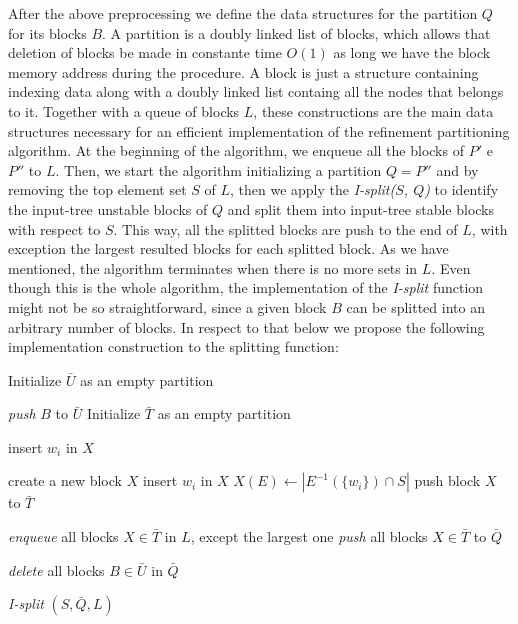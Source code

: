 \documentclass[12pt]{diazessay} %
\begin{document}
After the above preprocessing we define the data structures for the partition $Q$ for its blocks $B$. A partition is a doubly linked list of blocks, which allows that deletion of blocks be made in constante time $O(1)$ as long we have the block memory address during the procedure. A block is just a structure containing indexing data along with a doubly linked list containg all the nodes that belongs to it. Together with a queue of blocks $L$, these constructions are the main data structures necessary for an efficient implementation of the refinement partitioning algorithm. At the beginning of the algorithm, we enqueue all the blocks of $P'$ e $P''$ to $L$. Then, we start the algorithm initializing a partition $Q = P''$ and by removing the top element set $S$ of $L$, then we apply the \textit{I-split($S$, $Q$)} to identify the input-tree unstable blocks of $Q$ and split them into input-tree stable blocks with respect to  $S$. This way, all the splitted blocks are push to the end of $L$, with exception the largest resulted blocks for each splitted block. As we have mentioned, the algorithm terminates when there is no more sets in $L$. Even though this is the whole algorithm, the implementation of the \textit{I-split} function might not be so straightforward, since a given block $B$ can be splitted into an arbitrary number of blocks. In respect to that below we propose the following implementation construction to the splitting function:

\begin{algorithm}[h]
	\SetAlgoLined
	Initialize $\bar{U}$ as an empty partition\;
	{
		{
			\textit{push} $B$ to $\bar{U}$\;
			Initialize $\bar{T}$ as an empty partition\;
			{
				{
					insert $w_i$ in $X$\;
					
				}
				{
					create a new block $X$\;
					insert $w_i$ in $X$\;
					$X(E) \leftarrow | E^{-1}(\{w_i\})\cap S |$\;
					push block $X$ to $\bar{T}$ 
				}
			}
		}
		\textit{enqueue} all blocks $X \in \bar{T}$ in $L$, except the largest one\;
		\textit{push} all blocks $X \in \bar{T}$ to $\bar{Q}$\;
	}
	\textit{delete} all blocks $B \in \bar{U}$ in $\bar{Q}$
	\caption{\textit{I-split} $(S,\bar{Q}, L)$}
\end{algorithm}
\end{document}
